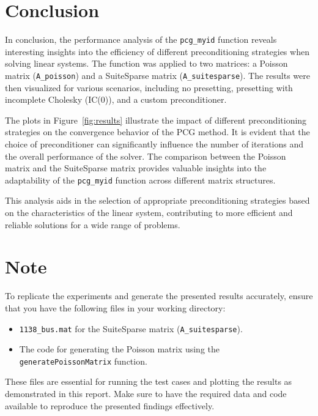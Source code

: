 \section*{Conclusion}

In conclusion, the performance analysis of the \texttt{pcg\_myid} function reveals interesting insights into the efficiency of different preconditioning strategies when solving linear systems. The function was applied to two matrices: a Poisson matrix (\texttt{A\_poisson}) and a SuiteSparse matrix (\texttt{A\_suitesparse}). The results were then visualized for various scenarios, including no presetting, presetting with incomplete Cholesky (IC(0)), and a custom preconditioner.

The plots in Figure~\ref{fig:results} illustrate the impact of different preconditioning strategies on the convergence behavior of the PCG method. It is evident that the choice of preconditioner can significantly influence the number of iterations and the overall performance of the solver. The comparison between the Poisson matrix and the SuiteSparse matrix provides valuable insights into the adaptability of the \texttt{pcg\_myid} function across different matrix structures.

This analysis aids in the selection of appropriate preconditioning strategies based on the characteristics of the linear system, contributing to more efficient and reliable solutions for a wide range of problems.

\section*{Note}

To replicate the experiments and generate the presented results accurately, ensure that you have the following files in your working directory:

\begin{itemize}
    \item \texttt{1138\_bus.mat} for the SuiteSparse matrix (\texttt{A\_suitesparse}).
    \item The code for generating the Poisson matrix using the \texttt{generatePoissonMatrix} function.
\end{itemize}

These files are essential for running the test cases and plotting the results as demonstrated in this report. Make sure to have the required data and code available to reproduce the presented findings effectively.



